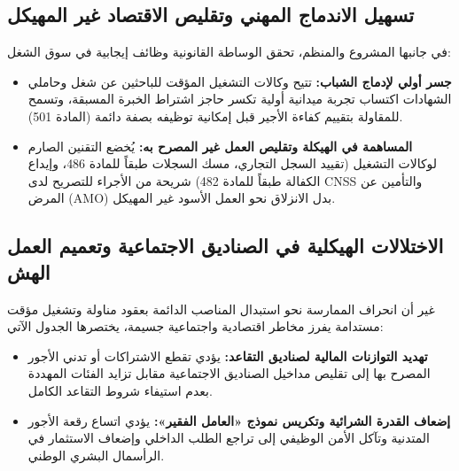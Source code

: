 \subsection{تسهيل الاندماج المهني وتقليص الاقتصاد غير المهيكل}
في جانبها المشروع والمنظم، تحقق الوساطة القانونية وظائف إيجابية في سوق الشغل:
\begin{itemize}[leftmargin=*, itemsep=5pt]
    \item \textbf{جسر أولي لإدماج الشباب:} تتيح وكالات التشغيل المؤقت للباحثين عن شغل وحاملي الشهادات اكتساب تجربة ميدانية أولية تكسر حاجز اشتراط الخبرة المسبقة، وتسمح للمقاولة بتقييم كفاءة الأجير قبل إمكانية توظيفه بصفة دائمة (المادة \textenglish{501}).
    \item \textbf{المساهمة في الهيكلة وتقليص العمل غير المصرح به:} يُخضع التقنين الصارم لوكالات التشغيل (تقييد السجل التجاري، مسك السجلات طبقاً للمادة \textenglish{486}، وإيداع الكفالة طبقاً للمادة \textenglish{482}) شريحة من الأجراء للتصريح لدى \textenglish{CNSS} والتأمين عن المرض (\textenglish{AMO}) بدل الانزلاق نحو العمل الأسود غير المهيكل.
\end{itemize}

\subsection{الاختلالات الهيكلية في الصناديق الاجتماعية وتعميم العمل الهش}
غير أن انحراف الممارسة نحو استبدال المناصب الدائمة بعقود مناولة وتشغيل مؤقت مستدامة يفرز مخاطر اقتصادية واجتماعية جسيمة، يختصرها الجدول الآتي:
\begin{itemize}[leftmargin=*, itemsep=4pt]
    \item \textbf{تهديد التوازنات المالية لصناديق التقاعد:} يؤدي تقطع الاشتراكات أو تدني الأجور المصرح بها إلى تقليص مداخيل الصناديق الاجتماعية مقابل تزايد الفئات المهددة بعدم استيفاء شروط التقاعد الكامل.
    \item \textbf{إضعاف القدرة الشرائية وتكريس نموذج «العامل الفقير»:} يؤدي اتساع رقعة الأجور المتدنية وتآكل الأمن الوظيفي إلى تراجع الطلب الداخلي وإضعاف الاستثمار في الرأسمال البشري الوطني.
\end{itemize}

